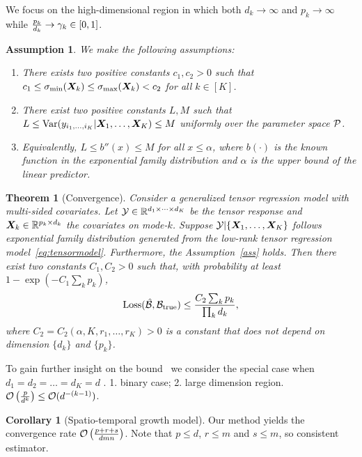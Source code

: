\documentclass[twoside]{article}
\theoremstyle{plain}
\newtheorem{thm}{Theorem}[section]
\newtheorem{assumption}{Assumption}
\theoremstyle{definition}
\newtheorem{cor}{Corollary}
\begin{document}
We focus on the high-dimensional region in which both $d_k\to \infty$ and $p_k\to\infty$ while ${p_k\over d_k} \to \gamma_k \in[0,1]$. 
\begin{assumption}\label{ass}We make the following assumptions:
\vspace{-.5cm}
\begin{enumerate}
\item [1.] There exists two positive constants $c_1,c_2>0$ such that $c_1\leq \sigma_{\min}(\bm X_k)\leq  \sigma_{\max}(\bm X_k)<c_2$ for all $k\in[K]$.
\item [2.] There exist two positive constants $L, M$ such that $L\leq \text{Var}(y_{i_1,\ldots,i_K}|\bm X_1,\ldots,\bm X_K)\leq M$ uniformly over the parameter space $\mathcal{P}$. 
\item [2'.] Equivalently, $L\leq b''(x) \leq M$ for all $x\leq \alpha$, where $b(\cdot)$ is the known function in the exponential family distribution and $\alpha$ is the upper bound of the linear predictor. 
\end{enumerate}
\end{assumption}

  
\begin{thm}[Convergence]\label{thm:main}
Consider a generalized tensor regression model with multi-sided covariates. Let $\mathcal{Y}\in\mathbb{R}^{d_1\times \cdots\times d_K}$ be the tensor response and $\bm X_k\in\mathbb{R}^{p_k\times d_k}$ the covariates on mode-$k$. Suppose $\mathcal{Y}|\{\bm X_1,\ldots,\bm X_K\}$ follows exponential family distribution generated from the low-rank tensor regression model~\eqref{eq:tensormodel}. Furthermore, the Assumption~\eqref{ass} holds. Then there exist two constants $C_1, C_2>0$ such that, with probability at least $1-\exp(-C_1\sum_k p_k)$, 
\[
\text{Loss}(\hat {\mathcal{B}}, \mathcal{B}_{\text{true}}) \leq  {C_2\sum_k p_k \over \prod_k d_k},
\]
where $C_2=C_2(\alpha, K, r_1,\ldots,r_K)>0$ is a constant that does not depend on dimension $\{d_k\}$ and $\{p_k\}$. 
\end{thm}

To gain further insight on the bound~\label{thm:main} we consider the special case when $d_1=d_2=\ldots=d_K=d$ . 1. binary case; 2. large dimension region. $\mathcal{O}\left({p \over d^k}\right)\leq \mathcal{O}(d^{-(k-1)})$.

\begin{cor}[Spatio-temporal growth model] Our method yields the convergence rate $\mathcal{O}\left({p+r+s\over dmn}\right)$. Note that $p\leq d$, $r\leq m$ and $s\leq m$, so consistent estimator. 
\end{cor}
\end{document}

